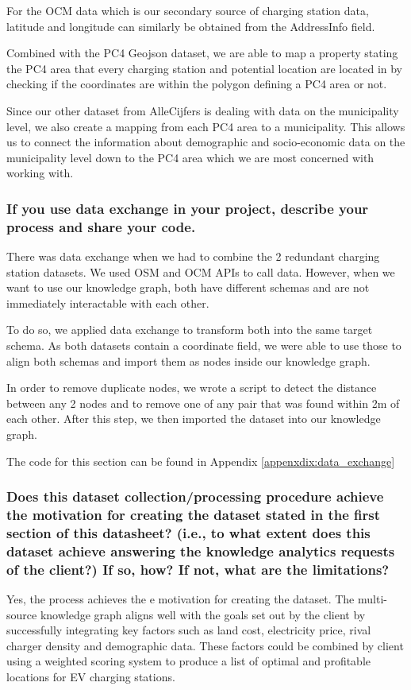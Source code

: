 \documentclass{article}
\newcommand{\question}[1]{#1}
\begin{document}
For the OCM data which is our secondary source of charging station data, latitude and longitude can similarly be obtained from the AddressInfo field.

Combined with the PC4 Geojson dataset, we are able to map a property stating the PC4 area that every charging station and potential location are located in by checking if the coordinates are within the polygon defining a PC4 area or not.

Since our other dataset from AlleCijfers is dealing with data on the municipality level, we also create a mapping from each PC4 area to a municipality. This allows us to connect the information about demographic and socio-economic data on the municipality level down to the PC4 area which we are most concerned with working with.

\question{\subsubsection*{If you use data exchange in your project, describe your process and share your code.}}
There was data exchange when we had to combine the 2 redundant charging station datasets. We used OSM and OCM APIs to call data. However, when we want to use our knowledge graph, both have different schemas and are not immediately interactable with each other.

To do so, we applied data exchange to transform both into the same target schema. As both datasets contain a coordinate field, we were able to use those to align both schemas and import them as nodes inside our knowledge graph.

In order to remove duplicate nodes, we wrote a script to detect the distance between any 2 nodes and to remove one of any pair that was found within 2m of each other. After this step, we then imported the dataset into our knowledge graph.

The code for this section can be found in Appendix \ref{appenxdix:data_exchange}

\question{\subsubsection*{Does this dataset collection/processing procedure achieve the motivation for creating the dataset stated in the first section of this datasheet? (i.e., to what extent does this dataset achieve answering the knowledge analytics requests of the client?)  If so, how?  If not, what are the limitations?}}
Yes, the process achieves the e motivation for creating the dataset. The multi-source knowledge graph aligns well with the goals set out by the client by successfully integrating key factors such as  land cost, electricity price, rival charger density and demographic data. These factors could be combined by client using a weighted scoring system to produce a list of optimal and profitable locations for EV charging stations.
\end{document}
